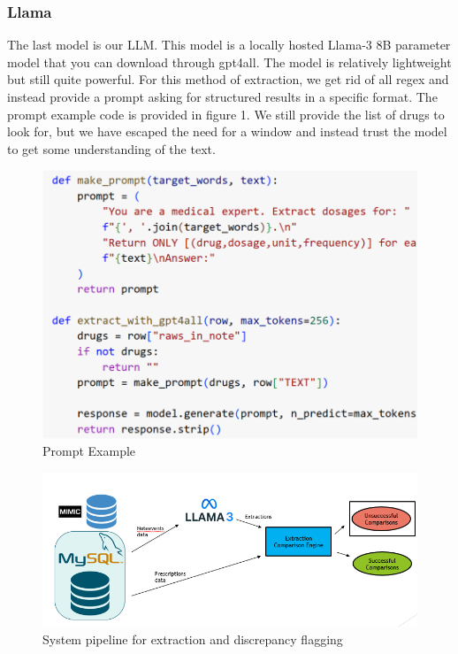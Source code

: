 \documentclass[sigconf,nonacm]{acmart} %
\begin{document}
\subsubsection{Llama}
The last model is our LLM. This model is a locally hosted Llama-3 8B parameter model that you can download through gpt4all. The model is relatively lightweight but still quite powerful. For this method of extraction, we get rid of all regex and instead provide a prompt asking for structured results in a specific format. The prompt example code is provided in figure 1. We still provide the list of drugs to look for, but we have escaped the need for a window and instead trust the model to get some understanding of the text.

\begin{figure}[t]
    \centering
    \includegraphics[width=.8\linewidth]{prompt_code.png}
    \caption{Prompt Example}
    \label{fig:prompt}
\end{figure}

\begin{figure}[t]
  \centering
  \includegraphics[width=\linewidth]{experiment_diagram.png}
  \caption{System pipeline for extraction and discrepancy flagging}
  \label{fig:pipeline}
\end{figure}
\end{document}
